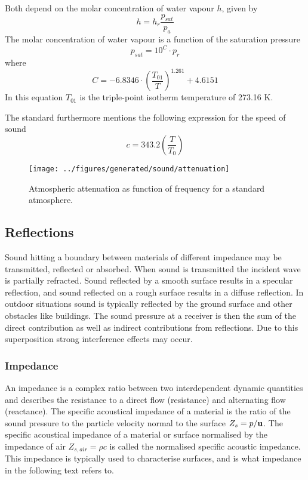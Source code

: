 Both depend on the molar concentration of water vapour $h$, given by
\begin{equation}
 h = h_r  \frac{p_{sat}}{p_a}
\end{equation}
The molar concentration of water vapour is a function of the saturation pressure
\begin{equation}
 p_{sat} = 10^C \cdot p_r
\end{equation}
where 
\begin{equation}
 C = -6.8346 \cdot \left( \frac{T_{01}}{T} \right)^{1.261}  + 4.6151
\end{equation}
In this equation $T_{01}$ is the triple-point isotherm temperature of 273.16 K.

The standard furthermore mentions the following expression for the speed of sound
\begin{equation}
c = 343.2 \left( \frac{T}{T_0} \right)
\end{equation}

\begin{figure}[H]
        \centering
        \texttt{[image: ../figures/generated/sound/attenuation]}
        \caption{Atmospheric attenuation as function of frequency for a standard atmosphere.}
        \label{fig:theory:sound:attenuation}
\end{figure}

\newpage
\subsection{Reflections}
Sound hitting a boundary between materials of different impedance may be
transmitted, reflected or absorbed. When sound is transmitted the incident wave
is partially refracted. Sound reflected by a smooth surface results in a
specular reflection, and sound reflected on a rough surface results in a diffuse
reflection. In outdoor situations sound is typically reflected by the ground
surface and other obstacles like buildings. The sound pressure at a receiver is
then the sum of the direct contribution as well as indirect contributions from
reflections. Due to this superposition strong interference effects may occur.

\subsubsection*{Impedance}
An impedance is a complex ratio between two interdependent dynamic quantities
and describes the resistance to a direct flow (resistance) and alternating flow
(reactance). The specific acoustical impedance of a material is the ratio of the
sound pressure to the particle velocity normal to the surface $Z_{s} =
p/\mathbf{u}$. The specific acoustical impedance of a material or surface
normalised by the impedance of air $Z_{s, air} = \rho c$ is called the
normalised specific acoustic impedance. This impedance is typically used to
characterise surfaces, and is what impedance in the following text refers to.

